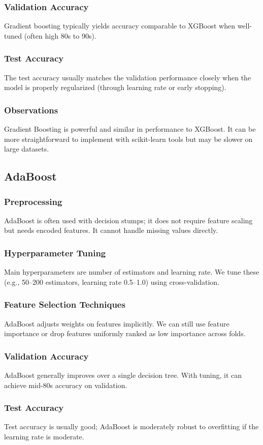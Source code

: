 \documentclass[12pt]{article}
\begin{document}
\subsubsection{Validation Accuracy}
Gradient boosting typically yields accuracy comparable to XGBoost when well-tuned (often high 80s to 90s).
\subsubsection{Test Accuracy}
The test accuracy usually matches the validation performance closely when the model is properly regularized (through learning rate or early stopping).
\subsubsection{Observations}
Gradient Boosting is powerful and similar in performance to XGBoost. It can be more straightforward to implement with scikit-learn tools but may be slower on large datasets.

\subsection{AdaBoost}
\subsubsection{Preprocessing}
AdaBoost is often used with decision stumps; it does not require feature scaling but needs encoded features. It cannot handle missing values directly.
\subsubsection{Hyperparameter Tuning}
Main hyperparameters are number of estimators and learning rate. We tune these (e.g., 50--200 estimators, learning rate 0.5--1.0) using cross-validation.
\subsubsection{Feature Selection Techniques}
AdaBoost adjusts weights on features implicitly. We can still use feature importance or drop features uniformly ranked as low importance across folds.
\subsubsection{Validation Accuracy}
AdaBoost generally improves over a single decision tree. With tuning, it can achieve mid-80s accuracy on validation.
\subsubsection{Test Accuracy}
Test accuracy is usually good; AdaBoost is moderately robust to overfitting if the learning rate is moderate.
\end{document}
